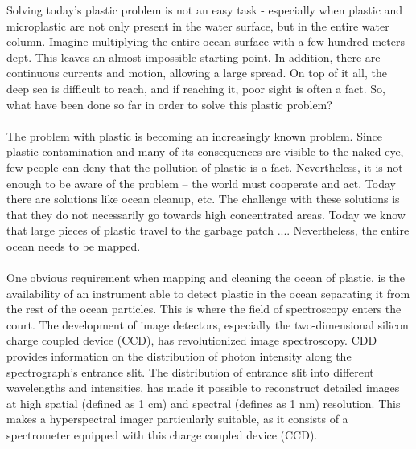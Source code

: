 \noindent
Solving today’s plastic problem is not an easy task - especially when plastic and microplastic are not only present in the water surface, but in the entire water column. Imagine multiplying the entire ocean surface with a few hundred meters dept. This leaves an almost impossible starting point. In addition, there are continuous currents and motion, allowing a large spread. On top of it all, the deep sea is difficult to reach, and if reaching it, poor sight is often a fact. So, what have been done so far in order to solve this plastic problem?
\\\\
The problem with plastic is becoming an increasingly known problem. Since plastic contamination and many of its consequences are visible to the naked eye, few people can deny that the pollution of plastic is a fact. Nevertheless, it is not enough to be aware of the problem – the world must cooperate and act. Today there are solutions like ocean cleanup, etc. The challenge with these solutions is that they do not necessarily go towards high concentrated areas. Today we know that large pieces of plastic travel to the garbage patch .... Nevertheless, the entire ocean needs to be mapped. %
\\\\
One obvious requirement when mapping and cleaning the ocean of plastic, is the availability of an instrument able to detect plastic in the ocean separating it from the rest of the ocean particles. This is where the field of spectroscopy enters the court. The development of image detectors, especially the two-dimensional silicon charge coupled device (CCD), has revolutionized image spectroscopy. CDD provides information on the distribution of photon intensity along the spectrograph's entrance slit. The distribution of entrance slit into different wavelengths and intensities, has made it possible to reconstruct detailed images at high spatial (defined as 1 cm) and spectral (defines as 1 nm) resolution. This makes a hyperspectral imager particularly suitable, as it consists of a spectrometer equipped with this charge coupled device (CCD). 
